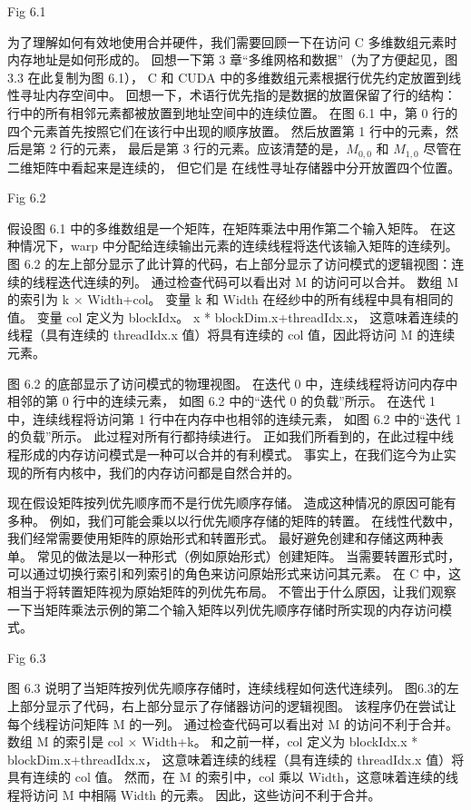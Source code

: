 {\color{red} Fig 6.1}

为了理解如何有效地使用合并硬件，我们需要回顾一下在访问 C 多维数组元素时内存地址是如何形成的。 
回想一下第 3 章“多维网格和数据”（为了方便起见，图 3.3 在此复制为图 6.1），
C 和 CUDA 中的多维数组元素根据行优先约定放置到线性寻址内存空间中。 
回想一下，术语行优先指的是数据的放置保留了行的结构：行中的所有相邻元素都被放置到地址空间中的连续位置。 
在图 6.1 中，第 0 行的四个元素首先按照它们在该行中出现的顺序放置。 然后放置第 1 行中的元素，然后是第 2 行的元素，
最后是第 3 行的元素。应该清楚的是，$M_{0,0}$ 和 $M_{1,0}$ 尽管在二维矩阵中看起来是连续的，
但它们是 在线性寻址存储器中分开放置四个位置。

{\color{red} Fig 6.2}

假设图 6.1 中的多维数组是一个矩阵，在矩阵乘法中用作第二个输入矩阵。 
在这种情况下，warp 中分配给连续输出元素的连续线程将迭代该输入矩阵的连续列。 
图 6.2 的左上部分显示了此计算的代码，右上部分显示了访问模式的逻辑视图：连续的线程迭代连续的列。 
通过检查代码可以看出对 M 的访问可以合并。 数组 M 的索引为 k × Width+col。 
变量 k 和 Width 在经纱中的所有线程中具有相同的值。 变量 col 定义为 blockIdx。 x * blockDim.x+threadIdx.x，
这意味着连续的线程（具有连续的 threadIdx.x 值）将具有连续的 col 值，因此将访问 M 的连续元素。

图 6.2 的底部显示了访问模式的物理视图。 在迭代 0 中，连续线程将访问内存中相邻的第 0 行中的连续元素，
如图 6.2 中的“迭代 0 的负载”所示。 在迭代 1 中，连续线程将访问第 1 行中在内存中也相邻的连续元素，
如图 6.2 中的“迭代 1 的负载”所示。 此过程对所有行都持续进行。 
正如我们所看到的，在此过程中线程形成的内存访问模式是一种可以合并的有利模式。 
事实上，在我们迄今为止实现的所有内核中，我们的内存访问都是自然合并的。

现在假设矩阵按列优先顺序而不是行优先顺序存储。 造成这种情况的原因可能有多种。 
例如，我们可能会乘以以行优先顺序存储的矩阵的转置。 在线性代数中，我们经常需要使用矩阵的原始形式和转置形式。 
最好避免创建和存储这两种表单。 常见的做法是以一种形式（例如原始形式）创建矩阵。 
当需要转置形式时，可以通过切换行索引和列索引的角色来访问原始形式来访问其元素。 
在 C 中，这相当于将转置矩阵视为原始矩阵的列优先布局。 
不管出于什么原因，让我们观察一下当矩阵乘法示例的第二个输入矩阵以列优先顺序存储时所实现的内存访问模式。

{\color{red} Fig 6.3}

图 6.3 说明了当矩阵按列优先顺序存储时，连续线程如何迭代连续列。 
图6.3的左上部分显示了代码，右上部分显示了存储器访问的逻辑视图。 该程序仍在尝试让每个线程访问矩阵 M 的一列。
通过检查代码可以看出对 M 的访问不利于合并。 数组 M 的索引是 col × Width+k。 
和之前一样，col 定义为 blockIdx.x * blockDim.x+threadIdx.x，
这意味着连续的线程（具有连续的 threadIdx.x 值）将具有连续的 col 值。 
然而，在 M 的索引中，col 乘以 Width，这意味着连续的线程将访问 M 中相隔 Width 的元素。 因此，这些访问不利于合并。

